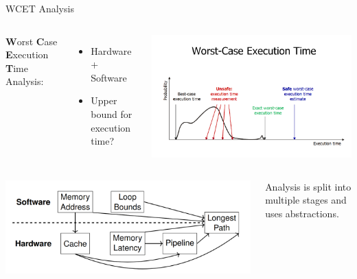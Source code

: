 \documentclass{beamer}
\begin{document}
\begin{frame}{WCET Analysis}
    \begin{columns}
        

        \textbf{W}orst \textbf{C}ase \textbf{E}xecution \textbf{T}ime Analysis:
        \begin{itemize}
            \item Hardware + Software
            \item Upper bound for execution time?
        \end{itemize}



        \includegraphics[width=1\textwidth]{pic/WCET.png}


    \end{columns}

    \pause

    \begin{columns}
        

        \includegraphics[width=1\textwidth]{pic/wcet-deps.png}


        \begin{block}{}
            Analysis is split into multiple stages and uses abstractions.
        \end{block}

    
        \end{columns}
\end{frame}
\end{document}
